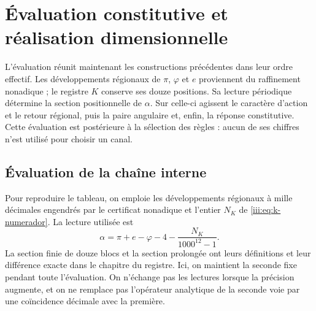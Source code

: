 \section{Évaluation constitutive et réalisation dimensionnelle}
\label{iii:iii:sec:evaluacion}

L’évaluation réunit maintenant les constructions précédentes dans leur ordre effectif.
Les développements régionaux de $\pi$, $\varphi$ et $e$ proviennent du raffinement
nonadique ; le registre $K$ conserve ses douze positions. Sa lecture périodique
détermine la section positionnelle de $\alpha$. Sur celle-ci agissent le caractère
d’action et le retour régional, puis la paire angulaire et, enfin, la
réponse constitutive. Cette évaluation est postérieure à la sélection des
règles : aucun de ses chiffres n’est utilisé pour choisir un canal.

\subsection{Évaluation de la chaîne interne}

Pour reproduire le tableau, on emploie les développements régionaux à mille
décimales engendrés par le certificat nonadique et l’entier $N_K$ de
\eqref{iii:eq:k-numerador}. La lecture utilisée est
\[
 \alpha=\pi+e-\varphi-4-\frac{N_K}{1000^{12}-1}.
\]
La section finie de douze blocs et la section prolongée ont leurs
définitions et leur différence exacte dans le chapitre du registre. Ici, on
maintient la seconde fixe pendant toute l’évaluation. On n’échange pas
les lectures lorsque la précision augmente, et on ne remplace pas l’opérateur analytique
de la seconde voie par une coïncidence décimale avec la première.


